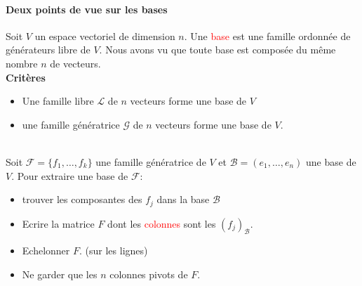 \paragraph{Deux points de vue sur les bases}
Soit $V$ un espace vectoriel de dimension $n$. Une \textcolor{red}{base} est une famille ordonnée de générateurs libre de $V$. Nous avons vu que toute base est composée du même nombre $n$ de vecteurs.
\\
\textbf{Critères}
\begin{itemize}
    \item Une famille libre $\mathcal{L}$ de $n$ vecteurs forme une base de $V$
    \item une famille génératrice $\mathcal{G}$ de $n$ vecteurs forme une base de $V$.
\end{itemize}
\\
Soit $\mathcal{F}  = \{f_1, \dots, f_k\}$ une famille génératrice de $V$ et $\mathcal{B} = (e_1, \dots, e_n)$ une base de $V$. Pour extraire une base de $\mathcal{F}:$
\begin{itemize}
    \item trouver les composantes des $f_j$ dans la base $\mathcal{B}$
    \item Ecrire la matrice $F$ dont les \textcolor{red}{colonnes} sont les $(f_j)_{\mathcal{B}}$.
    \item Echelonner $F$. (sur les lignes)
    \item Ne garder que les $n$ colonnes pivots de $F$.
    
\end{itemize}


